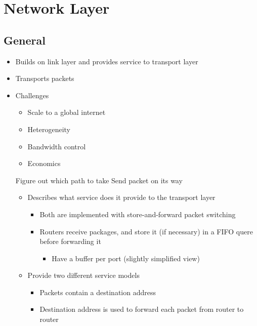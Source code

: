 
\section{Network Layer}
\subsection{General}
\begin{itemize}
    \item Builds on link layer and provides service to transport layer
    \item Transports packets
    \item Challenges
        \begin{itemize}
            \item Scale to a global internet
            \item Heterogeneity
            \item Bandwidth control
            \item Economics
        \end{itemize}
     Figure out which path to take
     Send packet on its way
        \begin{itemize}
            \item Describes what service does it provide to the transport layer
                \begin{itemize}
                    \item Both are implemented with store-and-forward packet switching
                    \item Routers receive packages, and store it (if necessary) in a FIFO quere before forwarding it
                        \begin{itemize}
                            \item Have a buffer per port (slightly simplified view)
                        \end{itemize}
                \end{itemize}
            \item Provide two different service models
                \begin{itemize}
                    \item Packets contain a destination address
                    \item Destination address is used to forward each packet from router to router

\end{itemize}
\end{itemize}
\end{itemize}
